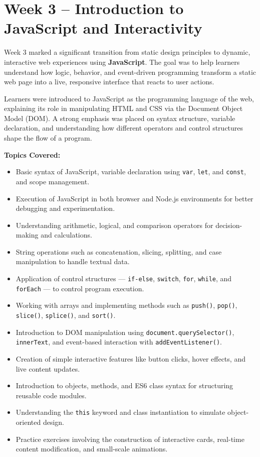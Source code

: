 \documentclass[a4paper,12pt,oneside]{report}
\numberwithin{equation}{chapter}
\numberwithin{figure}{chapter}
\numberwithin{table}{chapter}
\begin{document}
\vspace{5mm}
\noindent
\section{Week 3 – Introduction to JavaScript and Interactivity}

Week 3 marked a significant transition from static design principles to dynamic, interactive web experiences using \textbf{JavaScript}. The goal was to help learners understand how logic, behavior, and event-driven programming transform a static web page into a live, responsive interface that reacts to user actions.

Learners were introduced to JavaScript as the programming language of the web, explaining its role in manipulating HTML and CSS via the Document Object Model (DOM). A strong emphasis was placed on syntax structure, variable declaration, and understanding how different operators and control structures shape the flow of a program.

\textbf{Topics Covered:}
\begin{itemize}
    \item Basic syntax of JavaScript, variable declaration using \texttt{var}, \texttt{let}, and \texttt{const}, and scope management.
    \item Execution of JavaScript in both browser and Node.js environments for better debugging and experimentation.
    \item Understanding arithmetic, logical, and comparison operators for decision-making and calculations.
    \item String operations such as concatenation, slicing, splitting, and case manipulation to handle textual data.
    \item Application of control structures — \texttt{if-else}, \texttt{switch}, \texttt{for}, \texttt{while}, and \texttt{forEach} — to control program execution.
    \item Working with arrays and implementing methods such as \texttt{push()}, \texttt{pop()}, \texttt{slice()}, \texttt{splice()}, and \texttt{sort()}.
    \item Introduction to DOM manipulation using \texttt{document.querySelector()}, \texttt{innerText}, and event-based interaction with \texttt{addEventListener()}.
    \item Creation of simple interactive features like button clicks, hover effects, and live content updates.
    \item Introduction to objects, methods, and ES6 class syntax for structuring reusable code modules.
    \item Understanding the \texttt{this} keyword and class instantiation to simulate object-oriented design.
    \item Practice exercises involving the construction of interactive cards, real-time content modification, and small-scale animations.
\end{itemize}
\end{document}
